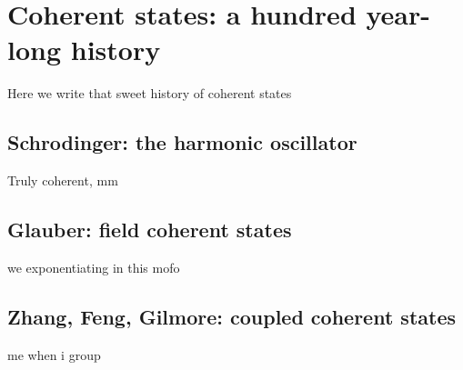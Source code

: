 \section{Coherent states: a hundred year-long history}
Here we write that sweet history of coherent states
	
\subsection{Schrodinger: the harmonic oscillator}
Truly coherent, mm
	
\subsection{Glauber: field coherent states}
we exponentiating in this mofo
	
\subsection{Zhang, Feng, Gilmore: coupled coherent states}
me when i group

